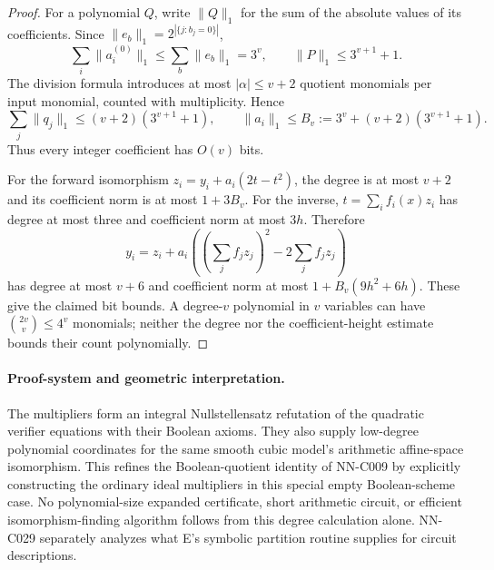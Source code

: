 \begin{proof}
For a polynomial $Q$, write $\|Q\|_1$ for the sum of the absolute
values of its coefficients. Since $\|e_b\|_1=2^{|\{j:b_j=0\}|}$,
\[
 \sum_i\|a_i^{(0)}\|_1\leq\sum_b\|e_b\|_1=3^v,
 \qquad \|P\|_1\leq3^{v+1}+1.
\]
The division formula introduces at most $|\alpha|\leq v+2$
quotient monomials per input monomial, counted with multiplicity.
Hence
\[
 \sum_j\|q_j\|_1\leq(v+2)(3^{v+1}+1),\qquad
 \|a_i\|_1\leq B_v:=3^v+(v+2)(3^{v+1}+1).
\]
Thus every integer coefficient has $O(v)$ bits.

For the forward isomorphism $z_i=y_i+a_i(2t-t^2)$, the degree is
at most $v+2$ and its coefficient norm is at most $1+3B_v$.
For the inverse, $t=\sum_i f_i(x)z_i$ has degree at most three and
coefficient norm at most $3h$. Therefore
\[
 y_i=z_i+a_i\left(\left(\sum_j f_jz_j\right)^2
                           -2\sum_j f_jz_j\right)
\]
has degree at most $v+6$ and coefficient norm at most
$1+B_v(9h^2+6h)$. These give the claimed bit bounds.
A degree-$v$ polynomial in $v$ variables can have
$\binom{2v}{v}\leq4^v$ monomials; neither the degree nor the
coefficient-height estimate bounds their count polynomially.
\end{proof}

\paragraph{Proof-system and geometric interpretation.}
The multipliers form an integral Nullstellensatz refutation of the
quadratic verifier equations with their Boolean axioms. They also
supply low-degree polynomial coordinates for the same smooth cubic
model's arithmetic affine-space isomorphism. This refines the
Boolean-quotient identity of NN-C009 by explicitly constructing the
ordinary ideal multipliers in this special empty Boolean-scheme
case. No polynomial-size expanded certificate, short arithmetic
circuit, or efficient isomorphism-finding algorithm follows from
this degree calculation alone. NN-C029 separately analyzes what E's
symbolic partition routine supplies for circuit descriptions.
